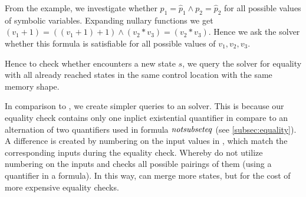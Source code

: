 From the example, we investigate whether $p_1 = \widehat{p}_1 \wedge p_2 =
\widehat{p}_2$ for all possible values of symbolic variables. Expanding nullary
functions we get $(v_1 + 1) = ((v_1 + 1) + 1) \wedge (v_2 * v_3) = (v_2 * v_3)$. Hence
we ask the \SMT solver whether this formula is satisfiable for all possible
values of $v_1, v_2, v_3$.

Hence to check whether \DIVINE encounters a new state $s$, we query the \SMT solver
for equality with all already reached states in the same control location with the same memory shape.

In comparison to \SymDIVINE, we create simpler queries to an \SMT solver.  This
is because our equality check contains only one inplict existential quantifier
in compare to an alternation of two quantifiers used in \SymDIVINE formula
$\mathit{notsubseteq}$ (see \autoref{subsec:equality}). A difference is created by
numbering on the input values in \DIVINE, which match the corresponding inputs
during the equality check. Whereby \SymDIVINE do not utilize numbering on the
inputs and checks all possible pairings of them (using a quantifier in a
formula). In this way, \SymDIVINE can merge more states, but for the cost of
more expensive equality checks.


